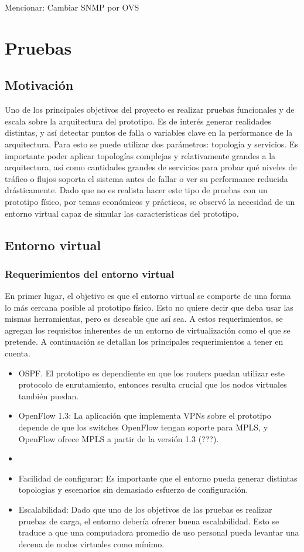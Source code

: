 \documentclass[a4paper,12pt]{report}
\begin{document}
\tableofcontents

Mencionar:
Cambiar SNMP por OVS

\chapter{Pruebas}
\section{Motivación}
Uno de los principales objetivos del proyecto es realizar pruebas funcionales y de escala sobre la arquitectura del prototipo. Es de interés generar realidades distintas, y así detectar puntos de falla o variables clave en la performance de la arquitectura. Para esto se puede utilizar dos parámetros: topología y servicios. Es importante poder aplicar topologías complejas y relativamente grandes a la arquitectura, así como cantidades grandes de servicios para probar qué niveles de tráfico o flujos soporta el sistema antes de fallar o ver su performance reducida drásticamente. Dado que no es realista hacer este tipo de pruebas con un prototipo físico, por temas económicos y prácticos, se observó la necesidad de un entorno virtual capaz de simular las características del prototipo.

\section{Entorno virtual}
\subsection{Requerimientos del entorno virtual}
En primer lugar, el objetivo es que el entorno virtual se comporte de una forma lo más cercana posible al prototipo físico. Esto no quiere decir que deba usar las mismas herramientas, pero es deseable que así sea. A estos requerimientos, se agregan los requisitos inherentes de un entorno de virtualización como el que se pretende. A continuación se detallan los principales requerimientos a tener en cuenta.
\begin{itemize} 
	\item OSPF. El prototipo es dependiente en que los routers puedan utilizar este protocolo de enrutamiento, entonces resulta crucial que los nodos virtuales también puedan.
	\item OpenFlow 1.3: La aplicación que implementa VPNs sobre el prototipo depende de que los switches OpenFlow tengan soporte para MPLS, y OpenFlow ofrece MPLS a partir de la versión 1.3 (???).
	\item 
	\item Facilidad de configurar: Es importante que el entorno pueda generar distintas topologias y escenarios sin demasiado esfuerzo de configuración.
	\item Escalabilidad: Dado que uno de los objetivos de las pruebas es realizar pruebas de carga, el entorno debería ofrecer buena escalabilidad. Esto se traduce a que una computadora promedio de uso personal pueda levantar una decena de nodos virtuales como mínimo.
\end{itemize}
\end{document}
